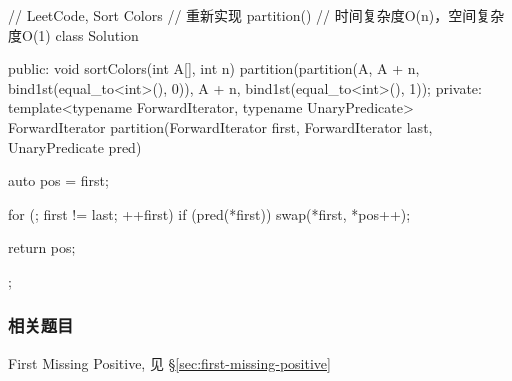 \begin{Code}
// LeetCode, Sort Colors
// 重新实现 partition()
// 时间复杂度O(n)，空间复杂度O(1)
class Solution {
public:
    void sortColors(int A[], int n) {
        partition(partition(A, A + n, bind1st(equal_to<int>(), 0)), A + n,
                bind1st(equal_to<int>(), 1));
    }
private:
    template<typename ForwardIterator, typename UnaryPredicate>
    ForwardIterator partition(ForwardIterator first, ForwardIterator last,
            UnaryPredicate pred) {
        auto pos = first;

        for (; first != last; ++first)
            if (pred(*first))
                swap(*first, *pos++);

        return pos;
    }
};
\end{Code}


\subsubsection{相关题目}
\begindot
\item First Missing Positive, 见 \S \ref{sec:first-missing-positive}
\myenddot

